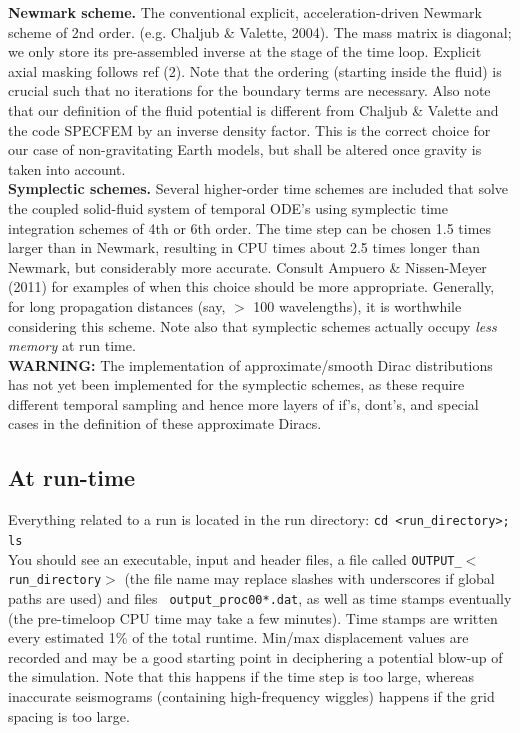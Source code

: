 \documentclass[11pt,letter,fleqn,english,notitlepage]{article}
\begin{document}
\noindent \textbf{Newmark scheme.}
The conventional explicit, acceleration-driven Newmark scheme of 2nd order.
(e.g. Chaljub \& Valette, 2004). The mass matrix is diagonal; we only store its
pre-assembled inverse at the stage of the time loop.  Explicit axial masking
follows ref (2).  Note that the ordering (starting inside the fluid) is crucial
such that no iterations for the boundary terms are necessary.  Also note that
our definition of the fluid potential is different from Chaljub \& Valette and
the code SPECFEM by an inverse density factor. This is the correct choice for
our case of non-gravitating Earth models, but shall be altered once gravity is
taken into account.\\

\noindent \textbf{Symplectic schemes.}
Several higher-order time schemes are included that solve the coupled
solid-fluid system of temporal ODE's using symplectic time integration schemes
of 4th or 6th order.  The time step can be chosen 1.5 times larger than in
Newmark, resulting in CPU times about 2.5 times longer than Newmark, but
considerably more accurate. Consult Ampuero \& Nissen-Meyer (2011) for examples
of when this choice should be more appropriate. Generally, for long propagation
distances (say, $>$ 100 wavelengths), it is worthwhile considering this scheme.
Note also that symplectic schemes actually occupy \textit{less memory} at run
time.\\

\textbf{WARNING:} The implementation of approximate/smooth Dirac distributions
has not yet been implemented for the symplectic schemes, as these require
different temporal sampling and hence more layers of if's, dont's, and special
cases in the definition of these approximate Diracs.

\subsection{At run-time} 
Everything related to a run is located in the run directory: {\tt cd
<run\_directory>; ls}\\ \noindent You should see an executable, input and
header files, a file called {\tt OUTPUT\_$<$run\_directory$>$} (the file name
may replace slashes with underscores if global paths are used) and files {\tt
output\_proc00*.dat}, as well as time stamps eventually (the pre-timeloop CPU
time may take a few minutes). Time stamps are written every estimated 1\% of
the total runtime.  Min/max displacement values are recorded and may be a good
starting point in deciphering a potential blow-up of the simulation. Note that
this happens if the time step is too large, whereas inaccurate seismograms
(containing high-frequency wiggles) happens if the grid spacing is too large.
\end{document}
